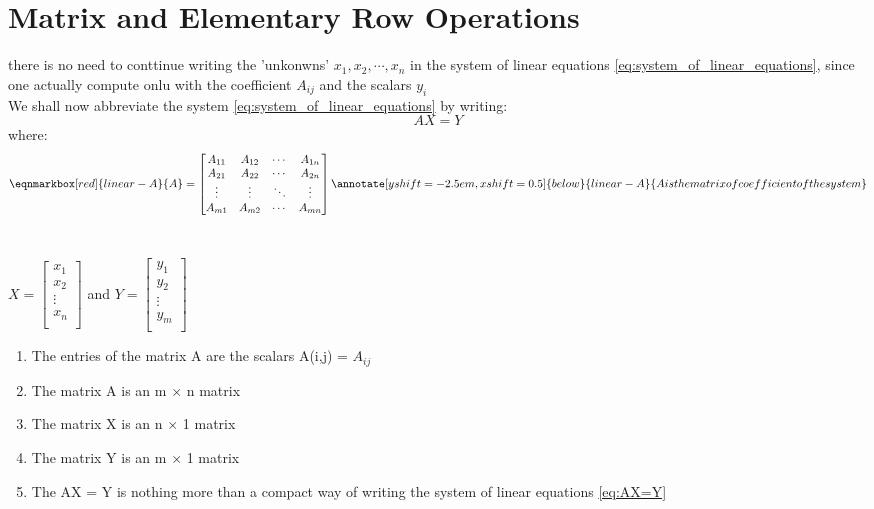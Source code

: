 \section{Matrix and Elementary Row Operations}
there is no need to conttinue writing the 'unkonwns' $x_1,x_2,\cdots,x_n$ in the system of linear equations \ref{eq:system_of_linear_equations},
since one actually compute onlu with the coefficient $A_{ij}$ and the scalars  $y_i$\\
We shall now abbreviate the system \ref{eq:system_of_linear_equations} by writing:
\[
	AX=Y
	\label{eq:AX=Y}
\]
where:
\begin{equation}
	\eqnmarkbox[red]{linear-A}{A} = \begin{bmatrix}
		A_{11} & A_{12} & \cdots & A_{1n} \\
		A_{21} & A_{22} & \cdots & A_{2n} \\
		\vdots & \vdots & \ddots & \vdots \\
		A_{m1} & A_{m2} & \cdots & A_{mn} \\
	\end{bmatrix}
	\annotate[yshift=-2.5em,xshift=0.5]{below}{linear-A}{A is the matrix of coefficient of the system}
	\label{eq:A equals}
\end{equation}
\\
\begin{center}


	$
		X = \begin{bmatrix}
			x_1    \\
			x_2    \\
			\vdots \\
			x_n    \\
		\end{bmatrix}
	$ \quad and \quad $
		Y = \begin{bmatrix}
			y_1    \\
			y_2    \\
			\vdots \\
			y_m    \\
		\end{bmatrix}
	$
\end{center}
\newpage
\begin{remark}
	\begin{enumerate}
		\item The entries of the matrix A are the scalars A(i,j) = $A_{ij}$
		\item The matrix A is an m $\times$ n matrix
		\item The matrix X is an n $\times$ 1 matrix
		\item The matrix Y is an m $\times$ 1 matrix
		\item The AX = Y is nothing more than a compact way of writing the system of linear equations
		      \ref{eq:AX=Y}
	\end{enumerate}
\end{remark}


